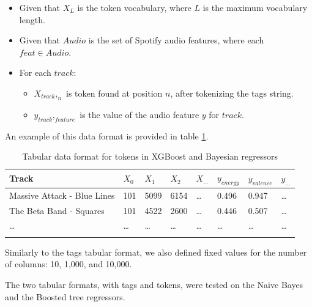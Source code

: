 \documentclass[sn-mathphys]{sn-jnl}%
\theoremstyle{thmstyleone}%
\theoremstyle{thmstyletwo}%
\theoremstyle{thmstylethree}%
\begin{document}
\begin{itemize}
      \item Given that $X_L$ is the token vocabulary, where $L$ is the maximum vocabulary length.
      \item Given that $Audio$ is the set of Spotify audio features, where each $feat \in Audio$.
      \item For each $track$:
      \begin{itemize}
            \item $X_{track},_{n}$ is token found at position $n$, after tokenizing the tags string.
            \item $y_{track},_{feature}$ is the value of the audio feature $y$ for $track$.
      \end{itemize}
\end{itemize}

An example of this data format is provided in table \ref{tabular_token_format}.

\begin{table}[h]
      \begin{center}
      \begin{minipage}{\textwidth}
      \caption{Tabular data format for tokens in XGBoost and Bayesian regressors}\label{tabular_token_format}%
      \begin{tabular}{@{}llllllll@{}}
      \toprule
      Track                         & $X_{0}$ & $X_{1}$ & $X_{2}$ & $X_{\dots}$ & $y_{energy}$ & $y_{valence}$ & $y_{\dots}$ \\
      \midrule
      Massive Attack - Blue Lines   & 101     & 5099    & 6154    &  \dots      & 0.496        & 0.947         &  \dots  \\
      The Beta Band - Squares       & 101     & 4522    & 2600    &  \dots      & 0.446        & 0.507         &  \dots  \\
      \dots                         & \dots   & \dots   & \dots   &  \dots      & \dots        & \dots         &  \dots  \\
      \botrule
      \end{tabular}
      \end{minipage}
      \end{center}
\end{table}

Similarly to the tags tabular format, we also defined fixed values for the number of columns: 10, 1,000, and 10,000.

The two tabular formats, with tags and tokens, were tested on the Naive Bayes and the Boosted tree regressors.
\end{document}
